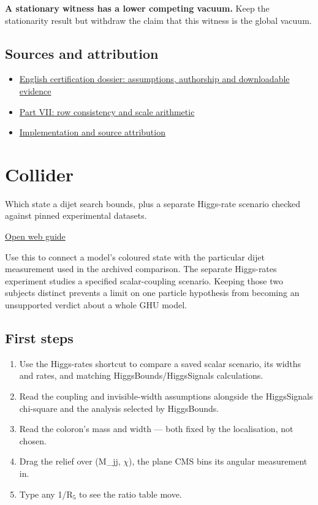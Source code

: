 \documentclass[11pt,a4paper]{article}
\begin{document}
\textbf{A stationary witness has a lower competing vacuum.} Keep the stationarity result but withdraw the claim that this witness is the global vacuum.

\subsection*{Sources and attribution}
\begin{itemize}
\item \href{https://karlesmarin.github.io/ghu-explorer/docs/su7-certification.html}{English certification dossier: assumptions, authorship and downloadable evidence}
\item \href{https://karlesmarin.github.io/ghu-explorer/papers/part-vii/index.html}{Part VII: row consistency and scale arithmetic}
\item \href{https://github.com/karlesmarin/ghu-lab/blob/main/src/sections/screen_section.js}{Implementation and source attribution}
\end{itemize}
\section{Collider}
Which state a dijet search bounds, plus a separate Higgs-rate scenario checked against pinned experimental datasets.

\href{https://karlesmarin.github.io/ghu-explorer/guide/collider/index.html}{Open web guide}

Use this to connect a model's coloured state with the particular dijet measurement used in the archived comparison. The separate Higgs-rates experiment studies a specified scalar-coupling scenario. Keeping those two subjects distinct prevents a limit on one particle hypothesis from becoming an unsupported verdict about a whole GHU model.
\subsection*{First steps}
\begin{enumerate}
\item Use the Higgs-rates shortcut to compare a saved scalar scenario, its widths and rates, and matching HiggsBounds/HiggsSignals calculations.
\item Read the coupling and invisible-width assumptions alongside the HiggsSignals chi-square and the analysis selected by HiggsBounds.
\item Read the coloron's mass and width --- both fixed by the localisation, not chosen.
\item Drag the relief over (M\_jj, \ensuremath{\chi}), the plane CMS bins its angular measurement in.
\item Type any 1/R\ensuremath{{}_{5}} to see the ratio table move.
\end{enumerate}
\end{document}
